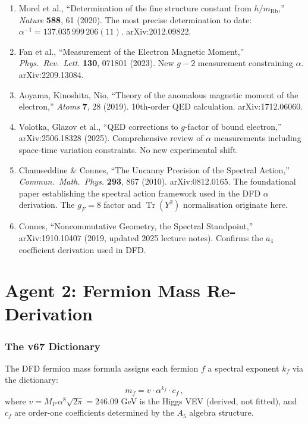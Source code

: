 \documentclass[11pt,a4paper]{article}
\newcommand{\Tr}{\operatorname{Tr}}
\begin{document}
\begin{enumerate}
\item Morel et al., ``Determination of the fine structure constant from $h/m_{\mathrm{Rb}}$,'' \textit{Nature} \textbf{588}, 61 (2020). The most precise determination to date: $\alpha^{-1} = 137.035\,999\,206(11)$. arXiv:2012.09822.

\item Fan et al., ``Measurement of the Electron Magnetic Moment,'' \textit{Phys.\ Rev.\ Lett.} \textbf{130}, 071801 (2023). New $g-2$ measurement constraining $\alpha$. arXiv:2209.13084.

\item Aoyama, Kinoshita, Nio, ``Theory of the anomalous magnetic moment of the electron,'' \textit{Atoms} \textbf{7}, 28 (2019). 10th-order QED calculation. arXiv:1712.06060.

\item Volotka, Glazov et al., ``QED corrections to $g$-factor of bound electron,'' arXiv:2506.18328 (2025). Comprehensive review of $\alpha$ measurements including space-time variation constraints. No new experimental shift.

\item Chamseddine \& Connes, ``The Uncanny Precision of the Spectral Action,'' \textit{Commun.\ Math.\ Phys.} \textbf{293}, 867 (2010). arXiv:0812.0165. The foundational paper establishing the spectral action framework used in the DFD $\alpha$ derivation. The $g_F = 8$ factor and $\Tr(Y^2)$ normalisation originate here.

\item Connes, ``Noncommutative Geometry, the Spectral Standpoint,'' arXiv:1910.10407 (2019, updated 2025 lecture notes). Confirms the $a_4$ coefficient derivation used in DFD.
\end{enumerate}


\part{Agent 2: Fermion Mass Re-Derivation}
\label{part:masses}

\section{The v67 Dictionary}

The DFD fermion mass formula assigns each fermion $f$ a spectral exponent $k_f$ via the dictionary:
\begin{equation}
m_f = v \cdot \alpha^{k_f} \cdot c_f\,,
\end{equation}
where $v = M_P\,\alpha^8\sqrt{2\pi} = 246.09$ GeV is the Higgs VEV (derived, not fitted), and $c_f$ are order-one coefficients determined by the $A_5$ algebra structure.
\end{document}
